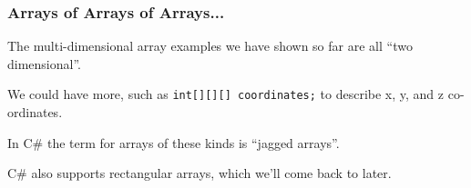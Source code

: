\begin{frame}
\frametitle{Arrays of Arrays of Arrays...}

The multi-dimensional array examples we have shown so far are all ``two dimensional''.

We could have more, such as \texttt{int[][][] coordinates;} to describe x, y, and z co-ordinates.

In C\# the term for arrays of these kinds is ``\alert{jagged} arrays''.

C\# also supports \alert{rectangular} arrays, which we'll come back to later. 

\end{frame}




